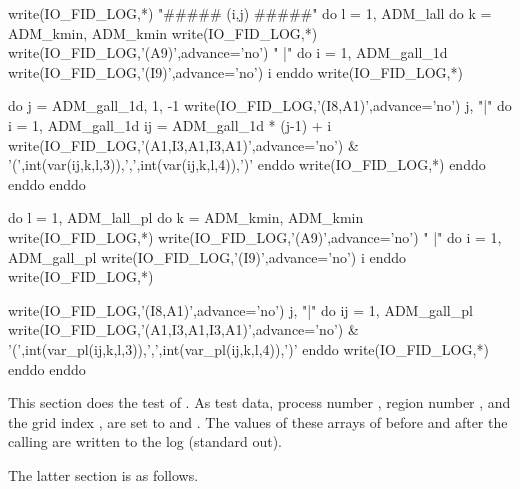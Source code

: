\begin{LstF90}[name=COMM_debugtest,firstnumber=last]
  write(IO_FID_LOG,*) "##### (i,j) #####"
  do l  = 1, ADM_lall
  do k = ADM_kmin, ADM_kmin
     write(IO_FID_LOG,*)
     write(IO_FID_LOG,'(A9)',advance='no') "        |"
     do i = 1, ADM_gall_1d
        write(IO_FID_LOG,'(I9)',advance='no') i
     enddo
     write(IO_FID_LOG,*)

     do j = ADM_gall_1d, 1, -1
        write(IO_FID_LOG,'(I8,A1)',advance='no') j, "|"
        do i = 1, ADM_gall_1d
           ij = ADM_gall_1d * (j-1) + i
           write(IO_FID_LOG,'(A1,I3,A1,I3,A1)',advance='no') &
                      '(',int(var(ij,k,l,3)),',',int(var(ij,k,l,4)),')'
        enddo
        write(IO_FID_LOG,*)
     enddo
  enddo
  enddo

  do l  = 1, ADM_lall_pl
  do k = ADM_kmin, ADM_kmin
     write(IO_FID_LOG,*)
     write(IO_FID_LOG,'(A9)',advance='no') "        |"
     do i = 1, ADM_gall_pl
        write(IO_FID_LOG,'(I9)',advance='no') i
     enddo
     write(IO_FID_LOG,*)

     write(IO_FID_LOG,'(I8,A1)',advance='no') j, "|"
     do ij = 1, ADM_gall_pl
        write(IO_FID_LOG,'(A1,I3,A1,I3,A1)',advance='no') &
                   '(',int(var_pl(ij,k,l,3)),',',int(var_pl(ij,k,l,4)),')'
     enddo
     write(IO_FID_LOG,*)
  enddo
  enddo



\end{LstF90}
%
This section does the test of .
%
As test data, process number , region number ,
and the grid index ,  are set to  and
.
%
The values of these arrays of before and after the calling
 are written to the log (standard out).

The latter section is as follows.

